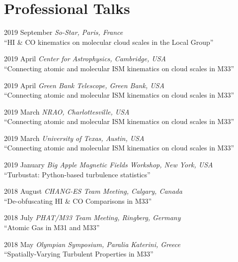 \documentclass[letterpaper,11pt]{article}
\newlength{\mainindent} \setlength{\mainindent}{12pt}
\newlength{\contentindent} \setlength{\contentindent}{19ex}
\newenvironment{datelist}{
  \begingroup
  \raggedright
  \begin{description}[labelindent=\mainindent,leftmargin=\contentindent,
      style=sameline,font=\normalfont,topsep=0pt,partopsep=0pt,parsep=0pt,
      itemsep=4pt]
}{
  \end{description}
  \endgroup
}
\begin{document}





\section*{Professional Talks}
\begin{datelist}
\item[2019 September] \emph{So-Star, Paris, France} \\ ``HI \& CO kinematics on molecular cloud scales in the Local Group''
\item[2019 April] \emph{Center for Astrophysics, Cambridge, USA} \\ ``Connecting atomic and molecular ISM kinematics on cloud scales in M33''
\item[2019 April] \emph{Green Bank Telescope, Green Bank, USA} \\ ``Connecting atomic and molecular ISM kinematics on cloud scales in M33''
\item[2019 March] \emph{NRAO, Charlottesville, USA} \\ ``Connecting atomic and molecular ISM kinematics on cloud scales in M33''
\item[2019 March] \emph{University of Texas, Austin, USA} \\ ``Connecting atomic and molecular ISM kinematics on cloud scales in M33''
\item[2019 January] \emph{Big Apple Magnetic Fields Workshop, New York, USA} \\ ``Turbustat: Python-based turbulence statistics''
\item[2018 August] \emph{CHANG-ES Team Meeting, Calgary, Canada} \\ ``De-obfuscating HI \& CO Comparisons in M33''
\item[2018 July] \emph{PHAT/M33 Team Meeting, Ringberg, Germany} \\ ``Atomic Gas in M31 and M33''
\item[2018 May] \emph{Olympian Symposium, Paralia Katerini, Greece} \\ ``Spatially-Varying Turbulent Properties in M33''

\end{datelist}
\end{document}
